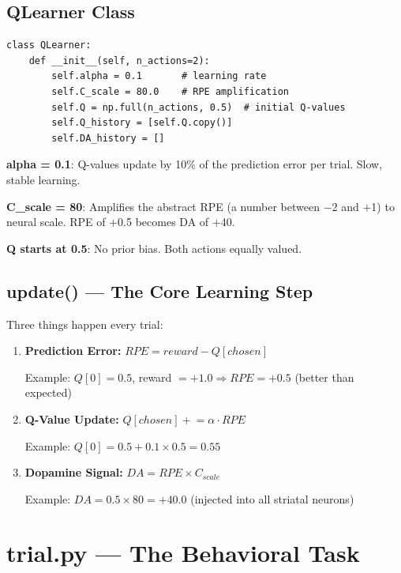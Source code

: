 \documentclass[11pt,a4paper]{article}
\begin{document}
\subsection{QLearner Class}

\begin{lstlisting}
class QLearner:
    def __init__(self, n_actions=2):
        self.alpha = 0.1       # learning rate
        self.C_scale = 80.0    # RPE amplification
        self.Q = np.full(n_actions, 0.5)  # initial Q-values
        self.Q_history = [self.Q.copy()]
        self.DA_history = []
\end{lstlisting}

\textbf{alpha = 0.1}: Q-values update by 10\% of the prediction error per trial. Slow, stable learning.

\textbf{C\_scale = 80}: Amplifies the abstract RPE (a number between $-$2 and $+$1) to neural scale. RPE of $+$0.5 becomes DA of $+$40.

\textbf{Q starts at 0.5}: No prior bias. Both actions equally valued.

\subsection{update() --- The Core Learning Step}

Three things happen every trial:

\begin{enumerate}
    \item \textbf{Prediction Error:} $RPE = reward - Q[chosen]$
    
    Example: $Q[0] = 0.5$, reward $= +1.0 \Rightarrow RPE = +0.5$ (better than expected)
    
    \item \textbf{Q-Value Update:} $Q[chosen] \mathrel{+}= \alpha \cdot RPE$
    
    Example: $Q[0] = 0.5 + 0.1 \times 0.5 = 0.55$
    
    \item \textbf{Dopamine Signal:} $DA = RPE \times C_{scale}$
    
    Example: $DA = 0.5 \times 80 = +40.0$ (injected into all striatal neurons)
\end{enumerate}

\newpage
\section{trial.py --- The Behavioral Task}
\end{document}

